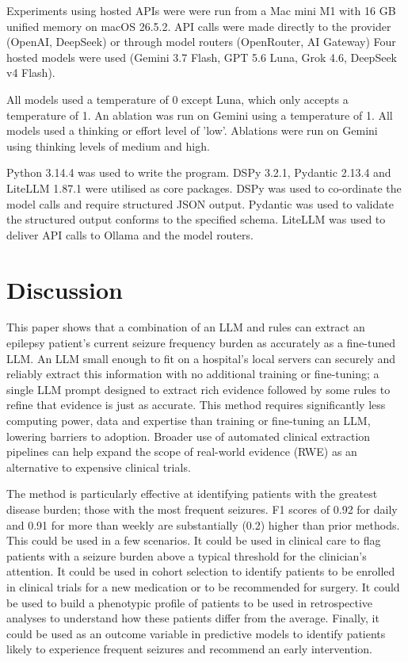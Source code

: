 \documentclass[conference]{IEEEtran}
\begin{document}
Experiments using hosted APIs were were run from a Mac 
mini M1 with 16 GB unified memory on macOS 26.5.2. API
calls were made directly to the provider (OpenAI, DeepSeek) 
or through model routers (OpenRouter, AI Gateway) Four 
hosted models were used (Gemini 3.7 Flash, GPT 5.6 Luna, 
Grok 4.6, DeepSeek v4 Flash). 

All models used a temperature of 0 except Luna, which only 
accepts a temperature of 1. An ablation was run on Gemini 
using a temperature of 1. All models used a thinking or effort 
level of 'low'. Ablations were run on Gemini using thinking
levels of medium and high. 

Python 3.14.4 was used to write the program. DSPy 3.2.1, 
Pydantic 2.13.4 and LiteLLM 1.87.1 were utilised as core
packages. DSPy was used to co-ordinate the model calls
and require structured JSON output. Pydantic was used
to validate the structured output conforms to the specified
schema. LiteLLM was used to deliver API calls to Ollama 
and the model routers.

\section{Discussion}

This paper shows that a combination of an LLM and rules
can extract an epilepsy patient's current seizure frequency 
burden as accurately as a fine-tuned LLM\cite{b2}. An LLM small 
enough to fit on a hospital's local servers can securely and 
reliably extract this information with no additional training 
or fine-tuning; a single LLM prompt designed to extract rich 
evidence followed by some rules to refine that evidence is 
just as accurate. This method requires significantly less 
computing power, data and expertise than training or 
fine-tuning an LLM, lowering barriers to adoption. Broader
use of automated clinical extraction pipelines can help 
expand the scope of real-world evidence (RWE) as an 
alternative to expensive clinical trials\cite{b2}.

The method is particularly effective at identifying patients
with the greatest disease burden; those with the most
frequent seizures. F1 scores of 0.92 for daily and 0.91
for more than weekly are substantially (0.2) higher than
prior methods\cite{b2}. This could be used in a few scenarios. 
It could be used in clinical care to flag patients with a seizure 
burden above a typical threshold for the clinician's attention. 
It could be used in cohort selection to identify patients to be 
enrolled in clinical trials for a new medication or to be 
recommended for surgery. It could be used to build a 
phenotypic profile of patients to be used in retrospective 
analyses to understand how these patients differ from the 
average. Finally, it could be used as an outcome variable in 
predictive models to identify patients likely to experience 
frequent seizures and recommend an early intervention\cite{b2}. 
\end{document}
